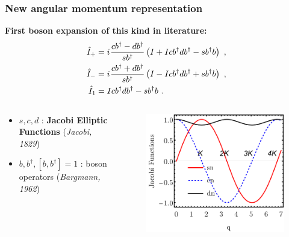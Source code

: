 \documentclass{beamer}
\newcommand{\iu}{{i\mkern1mu}}
\begin{document}
\begin{frame}
	\frametitle{New angular momentum representation}
	\vspace{-0.1cm}
	\textbf{First boson expansion of this kind in literature:}
	\begin{align}
		\hat{I}_+&=\iu\frac{cb^\dagger-db^\dagger}{sb^\dagger}\left(I+Icb^\dagger db^\dagger-sb^\dagger b\right)\ ,\nonumber\\
		\hat{I}_-&=\iu\frac{cb^\dagger+db^\dagger}{sb^\dagger}\left(I-Icb^\dagger db^\dagger+sb^\dagger b\right)\ ,\nonumber\\
		\hat{I}_1&=Icb^\dagger db^\dagger-sb^\dagger b\ .\nonumber
	\end{align}
	\vspace{-0.9cm}
	\begin{columns}
		\begin{column}{0.5\textwidth}
			\begin{itemize}
				\item $s,c,d$ : \textbf{Jacobi Elliptic Functions} (\textit{Jacobi, 1829})
				\item $b,b^\dagger,[b,b^\dagger]=1$ : boson operators (\textit{Bargmann, 1962}) 
			\end{itemize}
		\end{column}
		\begin{column}{0.5\textwidth}
			\begin{figure}
				\centering
				\includegraphics[scale=0.57]{figures/new-boson/Jacobi-Elliptic-Functions.pdf}
			\end{figure}
		\end{column}
	\end{columns}
\end{frame}
\end{document}

